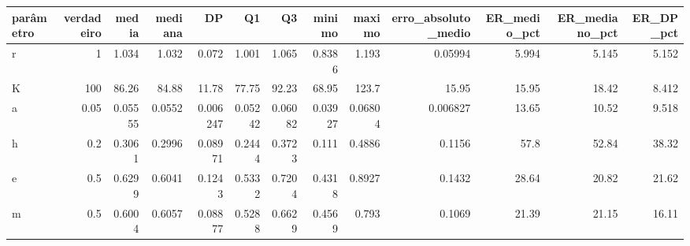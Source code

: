 \begin{tabular}{lrrrrrrrrrrrr}
\toprule
parâmetro & verdadeiro & media & mediana & DP & Q1 & Q3 & minimo & maximo & erro\_absoluto\_medio & ER\_medio\_pct & ER\_mediano\_pct & ER\_DP\_pct \\
\midrule
r & 1 & 1.034 & 1.032 & 0.072 & 1.001 & 1.065 & 0.8386 & 1.193 & 0.05994 & 5.994 & 5.145 & 5.152 \\
K & 100 & 86.26 & 84.88 & 11.78 & 77.75 & 92.23 & 68.95 & 123.7 & 15.95 & 15.95 & 18.42 & 8.412 \\
a & 0.05 & 0.05555 & 0.0552 & 0.006247 & 0.05242 & 0.06082 & 0.03927 & 0.06804 & 0.006827 & 13.65 & 10.52 & 9.518 \\
h & 0.2 & 0.3061 & 0.2996 & 0.08971 & 0.2444 & 0.3723 & 0.111 & 0.4886 & 0.1156 & 57.8 & 52.84 & 38.32 \\
e & 0.5 & 0.6299 & 0.6041 & 0.1243 & 0.5332 & 0.7204 & 0.4318 & 0.8927 & 0.1432 & 28.64 & 20.82 & 21.62 \\
m & 0.5 & 0.6004 & 0.6057 & 0.08877 & 0.5288 & 0.6629 & 0.4569 & 0.793 & 0.1069 & 21.39 & 21.15 & 16.11 \\
\bottomrule
\end{tabular}
